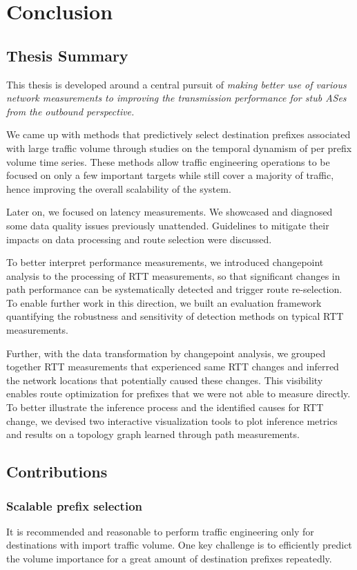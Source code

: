 \chapter{Conclusion}

\section{Thesis Summary}

This thesis is developed around a central pursuit of \textit{making better use of various network measurements to improving the transmission performance for stub ASes from the outbound perspective.}

We came up with methods that predictively select destination prefixes associated with large traffic volume through studies on the temporal dynamism of per prefix volume time series.
These methods allow traffic engineering operations to be focused on only a few important targets while still cover a majority of traffic, hence improving the overall scalability of the system.

Later on, we focused on latency measurements. 
We showcased and diagnosed some data quality issues previously unattended.
Guidelines to mitigate their impacts on data processing and route selection were discussed.

To better interpret performance measurements, we introduced changepoint analysis to the processing of RTT measurements, so that significant changes in path performance can be systematically detected and trigger route re-selection.
To enable further work in this direction, we built an evaluation framework quantifying the robustness and sensitivity of detection methods on typical RTT measurements.

Further, with the data transformation by changepoint analysis, we grouped together RTT measurements that experienced same RTT changes and inferred the network locations that potentially caused these changes. This visibility enables route optimization for prefixes that we were not able to measure directly.
To better illustrate the inference process and the identified causes for RTT change, we devised two interactive visualization tools to plot inference metrics and results on a topology graph learned through path measurements.

\section{Contributions}

\subsection{Scalable prefix selection}
It is recommended and reasonable to perform traffic engineering only for destinations with import traffic volume. One key challenge is to efficiently predict the volume importance for a great amount of destination prefixes repeatedly.

